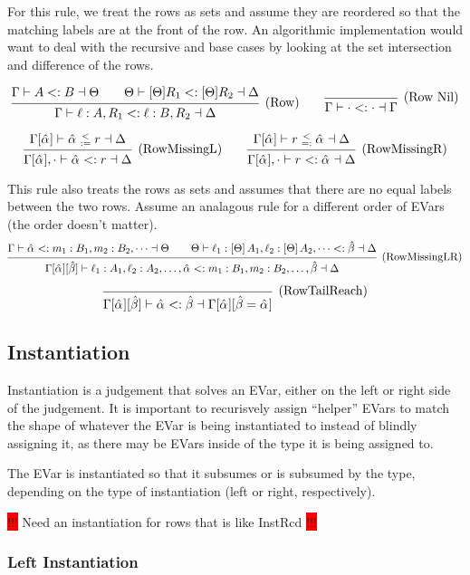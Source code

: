 \documentclass{article}
\newcommand{\consider}[1]{\colorbox{red}{!!!} #1 \colorbox{red}{!!!}}
\newcommand{\subsume}{<:}
\newcommand{\instLSymbol}{\;\substack{<\\:=}\;}
\newcommand{\instRSymbol}{\;\substack{<\\=:}\;}
\newcommand{\ev}{\hat}
\newcommand{\spc}{\qquad}
\newcommand{\apply}[1]{\left[#1\right]}
\newcommand{\eva}[1][]{\ev \alpha_{#1}}
\newcommand{\evb}{\ev \beta}
\newcommand{\subsumes}[4]{#1 \vdash #2 \subsume #3 \dashv #4}
\newcommand{\instL}[4]{#1 \vdash #2 \instLSymbol #3 \dashv #4}
\newcommand{\instR}[4]{#1 \vdash #2 \instRSymbol #3 \dashv #4}
\newcommand{\deduct}[3][]
{
  \begin{prooftree}
    \hypo{#2}
    \infer1[\text{#1}]{#3}
  \end{prooftree}
}
\begin{document}
For this rule, we treat the rows as sets and assume they are reordered so that
the matching labels are at the front of the row. An algorithmic implementation
would want to deal with the recursive and base cases by looking at the set
intersection and difference of the rows.

\[
  \deduct[(Row)]
  {\subsumes{\Gamma}{A}{B}{\Theta}
    \spc
    \subsumes{\Theta}{[\Theta] R_1}{[\Theta] R_2}{\Delta}
  }
  { \subsumes{\Gamma}{\ell : A, R_1}{\ell : B, R_2}{\Delta} }
  \spc
  \deduct[(Row Nil)]{}{ \subsumes{\Gamma}{\cdot}{\cdot}{\Gamma} }
\]

\[
  \deduct[(RowMissingL)]
  {\instL{\Gamma[\eva]}{\eva}{r}{\Delta}}
  {\subsumes{\Gamma[\eva], \cdot}{\eva}{r}{\Delta}}
  \spc
  \deduct[(RowMissingR)]
  {\instR{\Gamma[\eva]}{r}{\eva}{\Delta}}
  {\subsumes{\Gamma[\eva], \cdot}{r}{\eva}{\Delta}}
\]

This rule also treats the rows as sets and assumes that there are no equal
labels between the two rows. Assume an analagous rule for a different order of
EVars (the order doesn't matter).
\[
  \deduct[(RowMissingLR)]
  {\subsumes{\Gamma}{\eva}{m_1 : B_1, m_2 : B_2, \dots}{\Theta} \spc
    \subsumes{\Theta}{\ell_1 : \apply\Theta A_1, \ell_2 : \apply\Theta A_2,
      \dots}{\evb}{\Delta}}
  {\subsumes{\Gamma[\eva][\evb]}{\ell_1 : A_1, \ell_2 : A_2, \dots, \eva}{m_1 :
      B_1, m_2 : B_2, \dots, \evb}{\Delta}}
\]

\[
  \deduct[(RowTailReach)]
  {}
  {\subsumes{\Gamma[\eva][\evb]}{\eva}{\evb}{\Gamma[\eva][\evb=\eva]}}
\]


\subsection{Instantiation}

Instantiation is a judgement that solves an EVar, either on the left or right
side of the judgement. It is important to recurisvely assign ``helper'' EVars to
match the shape of whatever the EVar is being instantiated to instead of blindly
assigning it, as there may be EVars inside of the type it is being assigned to.

The EVar is instantiated so that it subsumes or is subsumed by the type,
depending on the type of instantiation (left or right, respectively).

\consider{Need an instantiation for rows that is like InstRcd}

\subsubsection{Left Instantiation}
\end{document}
